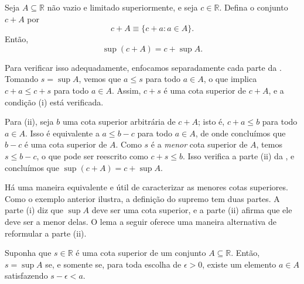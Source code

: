 \begin{example}\label{ex:sup-translacao}
Seja $A \subseteq \mathbb{R}$ não vazio e limitado superiormente, e seja $c \in \mathbb{R}$. Defina o conjunto $c + A$ por
\[
c + A \equiv  \{ c + a : a \in A \}.
\]
Então, 
$$\sup(c + A) = c + \sup A.$$

Para verificar isso adequadamente, enfocamos separadamente cada parte da . Tomando $s = \sup A$, vemos que $a \leq s$ para todo $a \in A$, o que implica $c + a \leq c + s$ para todo $a \in A$. Assim, $c + s$ é uma cota superior de $c + A$, e a condição (i) está verificada.

Para (ii), seja $b$ uma cota superior arbitrária de $c + A$; isto é, $c + a \leq b$ para todo $a \in A$. Isso é equivalente a $a \leq b - c$ para todo $a \in A$, de onde concluímos que $b - c$ é uma cota superior de $A$. Como $s$ é a \textit{menor} cota superior de $A$, temos $s \leq b - c$, o que pode ser reescrito como $c + s \leq b$. Isso verifica a parte (ii) da , e concluímos que $\sup(c + A) = c + \sup A$.
\end{example}

Há uma maneira equivalente e útil de caracterizar as menores cotas superiores. Como o exemplo anterior ilustra, a definição do supremo tem duas partes. A parte (i) diz que $\sup A$ deve ser uma cota superior, e a parte (ii) afirma que ele deve ser a menor delas. O lema a seguir oferece uma maneira alternativa de reformular a parte (ii).

\begin{lemma}\label{lem:caracterizacao-supremo}
Suponha que $s \in \mathbb{R}$ é uma cota superior de um conjunto $A \subseteq \mathbb{R}$. Então, $s = \sup A$ se, e somente se, para toda escolha de $\epsilon > 0$, existe um elemento $a \in A$ satisfazendo $s - \epsilon < a$. 
\end{lemma}


